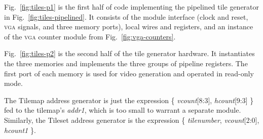 \documentclass[11pt]{article}
\newcommand{\figref}[1]{Fig.~\ref{fig:#1}}
\begin{document}
\figref{tiles-p1} is the first half of code implementing the pipelined
tile generator in \figref{tiles-pipelined}.  It consists of the module
interface (clock and reset, \textsc{vga} signals, and three memory
ports), local wires and registers, and an instance of the \textsc{vga}
counter module from \figref{vga-counters}.

\figref{tiles-p2} is the second half of the tile generator hardware.
It instantiates the three memories and implements the three groups of
pipeline registers.  The first port of each memory is used for video
generation and operated in read-only mode.

The Tilemap address generator is just the expression \{
\emph{vcount}[8:3], \emph{hcount}[9:3] \} fed to the tilemap's
\emph{addr1}, which is too small to warrant a separate module.
Similarly, the Tileset address generator is the expression \{
\emph{tilenumber}, \emph{vcount}[2:0], \emph{hcount1} \}.
\end{document}
